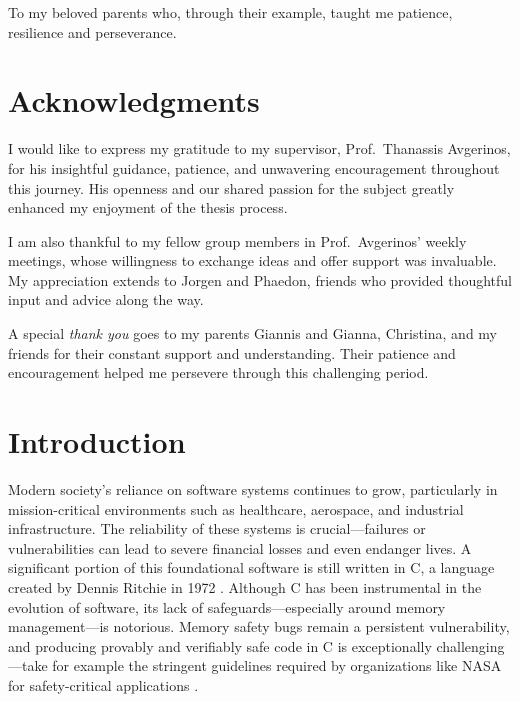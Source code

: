 \documentclass[
  a4paper,
]{scrreprt}
\newcommand*\listoflistings{\listof{codelisting}{List of Listings}}
\theoremstyle{definition}
\theoremstyle{remark}
\begin{document}
\newpage{}

\clearpage
\thispagestyle{empty}
\vspace*{0.3\textheight}
\begin{flushright}
\itshape
 
To my beloved parents who, through their example, taught me patience, resilience and perseverance.

\end{flushright}
\newpage


\chapter*{Acknowledgments}\label{acknowledgments}


I would like to express my gratitude to my supervisor, Prof.~Thanassis
Avgerinos, for his insightful guidance, patience, and unwavering
encouragement throughout this journey. His openness and our shared
passion for the subject greatly enhanced my enjoyment of the thesis
process.

I am also thankful to my fellow group members in Prof.~Avgerinos' weekly
meetings, whose willingness to exchange ideas and offer support was
invaluable. My appreciation extends to Jorgen and Phaedon, friends who
provided thoughtful input and advice along the way.

A special \emph{thank you} goes to my parents Giannis and Gianna,
Christina, and my friends for their constant support and understanding.
Their patience and encouragement helped me persevere through this
challenging period.

\newpage{}

\tableofcontents
\listoffigures
\listoflistings
\listoftables

\newpage{}


\chapter{Introduction}\label{introduction}


Modern society's reliance on software systems continues to grow,
particularly in mission-critical environments such as healthcare,
aerospace, and industrial infrastructure. The reliability of these
systems is crucial---failures or vulnerabilities can lead to severe
financial losses and even endanger lives. A significant portion of this
foundational software is still written in C, a language created by
Dennis Ritchie in 1972 \autocite{kernighan1978,ritchie1978}. Although C
has been instrumental in the evolution of software, its lack of
safeguards---especially around memory management---is notorious. Memory
safety bugs remain a persistent vulnerability, and producing provably
and verifiably safe code in C is exceptionally challenging---take for
example the stringent guidelines required by organizations like NASA for
safety-critical applications \autocite{holzmann2006}.
\end{document}
